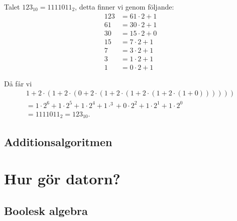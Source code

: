 \documentclass{beamer}
\theoremstyle{definition}
\theoremstyle{remark}
\begin{document}
\begin{frame}{\insertsubsectionhead}
  \begin{example}
    Talet \(123_{10} = 1111011_2\), detta finner vi genom följande:
    \begin{align*}
      123 &= 61\cdot 2 + 1 \\
      61 &= 30\cdot 2 + 1 \\
      30 &= 15\cdot 2 + 0 \\
      15 &= 7\cdot 2 + 1 \\
      7 &= 3\cdot 2 + 1 \\
      3 &= 1\cdot 2 + 1 \\
      1 &= 0\cdot 2 + 1
    \end{align*}
  \end{example}
\end{frame}
\begin{frame}{\insertsubsectionhead}
  \begin{example}[Fortsättning]
    Då får vi
    \begin{multline}
       \nonumber
      1 + 2\cdot (1 + 2\cdot (0 + 2\cdot (1 + 2\cdot (1 + 2\cdot (1 + 2\cdot
        (1 + 0)))))) \\
      = 1\cdot 2^6 + 1\cdot 2^5 + 1\cdot 2^4 + 1\cdot^3 + 0\cdot 2^2 +
        1\cdot 2^1 + 1\cdot 2^0 \\
      = 1111011_2 = 123_{10}.
    \end{multline}
  \end{example}
\end{frame}

\subsection{Additionsalgoritmen}

\begin{frame}{\insertsubsectionhead}
\end{frame}


\section{Hur gör datorn?}

\subsection{Boolesk algebra}
\end{document}
